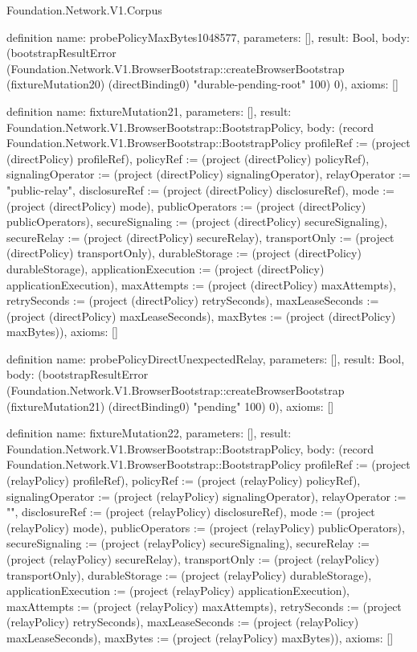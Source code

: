 \begin{lexlean}{Foundation.Network.V1.Corpus}
\begin{semanticmodule}
definition{
  name: probePolicyMaxBytes1048577,
  parameters: [],
  result: Bool,
  body: (bootstrapResultError (Foundation.Network.V1.BrowserBootstrap::createBrowserBootstrap (fixtureMutation20) (directBinding0) "durable-pending-root" 100) 0),
  axioms: []
}

definition{
  name: fixtureMutation21,
  parameters: [],
  result: Foundation.Network.V1.BrowserBootstrap::BootstrapPolicy,
  body: (record Foundation.Network.V1.BrowserBootstrap::BootstrapPolicy {profileRef := (project (directPolicy) profileRef), policyRef := (project (directPolicy) policyRef), signalingOperator := (project (directPolicy) signalingOperator), relayOperator := "public-relay", disclosureRef := (project (directPolicy) disclosureRef), mode := (project (directPolicy) mode), publicOperators := (project (directPolicy) publicOperators), secureSignaling := (project (directPolicy) secureSignaling), secureRelay := (project (directPolicy) secureRelay), transportOnly := (project (directPolicy) transportOnly), durableStorage := (project (directPolicy) durableStorage), applicationExecution := (project (directPolicy) applicationExecution), maxAttempts := (project (directPolicy) maxAttempts), retrySeconds := (project (directPolicy) retrySeconds), maxLeaseSeconds := (project (directPolicy) maxLeaseSeconds), maxBytes := (project (directPolicy) maxBytes)}),
  axioms: []
}

definition{
  name: probePolicyDirectUnexpectedRelay,
  parameters: [],
  result: Bool,
  body: (bootstrapResultError (Foundation.Network.V1.BrowserBootstrap::createBrowserBootstrap (fixtureMutation21) (directBinding0) "pending" 100) 0),
  axioms: []
}

definition{
  name: fixtureMutation22,
  parameters: [],
  result: Foundation.Network.V1.BrowserBootstrap::BootstrapPolicy,
  body: (record Foundation.Network.V1.BrowserBootstrap::BootstrapPolicy {profileRef := (project (relayPolicy) profileRef), policyRef := (project (relayPolicy) policyRef), signalingOperator := (project (relayPolicy) signalingOperator), relayOperator := "", disclosureRef := (project (relayPolicy) disclosureRef), mode := (project (relayPolicy) mode), publicOperators := (project (relayPolicy) publicOperators), secureSignaling := (project (relayPolicy) secureSignaling), secureRelay := (project (relayPolicy) secureRelay), transportOnly := (project (relayPolicy) transportOnly), durableStorage := (project (relayPolicy) durableStorage), applicationExecution := (project (relayPolicy) applicationExecution), maxAttempts := (project (relayPolicy) maxAttempts), retrySeconds := (project (relayPolicy) retrySeconds), maxLeaseSeconds := (project (relayPolicy) maxLeaseSeconds), maxBytes := (project (relayPolicy) maxBytes)}),
  axioms: []
}


\end{semanticmodule}
\end{lexlean}
